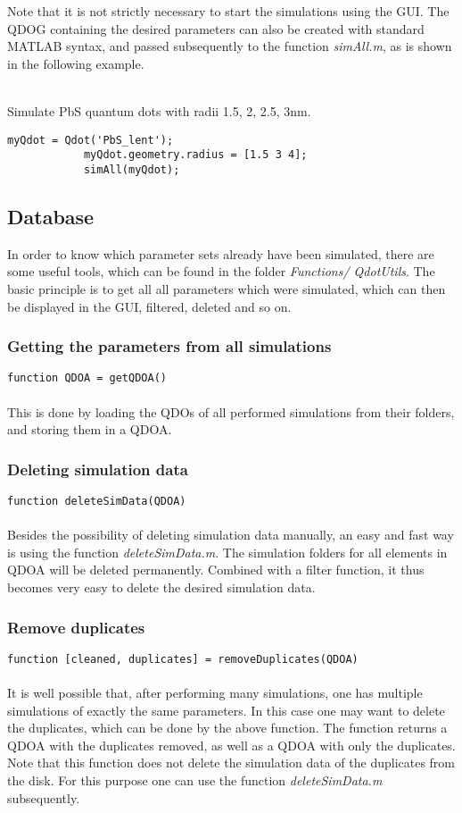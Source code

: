 	Note that it is not strictly necessary to start the simulations using the GUI. The QDOG containing the desired parameters can also be created with 
	standard MATLAB syntax, and passed subsequently to the function \textit{simAll.m}, as is shown in the following example.\\
	\\
	\begin{EXAMPLE} Simulate PbS  quantum dots with radii 1.5, 2, 2.5, 3nm. 
		\begin{lstlisting}[frame = none]
			myQdot = Qdot('PbS_lent');
			myQdot.geometry.radius = [1.5 3 4]; 
			simAll(myQdot);\end{lstlisting}
	\end{EXAMPLE}
	
	
\subsection{Database}
	In order to know which parameter sets already have been simulated, there are some useful tools, which can be found in the folder \textit{Functions/
	QdotUtils}. The basic principle is to get all all parameters which were simulated, which can then be displayed in the GUI, filtered, deleted and so on.
	
	\subsubsection{Getting the parameters from all simulations}
		\lstinline{function QDOA = getQDOA()}\\\\
		This is done by loading the QDOs of all performed simulations from their folders, and storing them in a QDOA. 
	\subsubsection{Deleting simulation data}
		\lstinline{function deleteSimData(QDOA)}\\\\
		Besides the possibility of deleting simulation data manually, an easy and fast way is using the function \textit{deleteSimData.m}. 
		The simulation folders for all elements in QDOA will be deleted permanently. Combined with a filter function, it thus becomes very easy to 
		delete the desired simulation data.
	\subsubsection{Remove duplicates}
		\lstinline{function [cleaned, duplicates] = removeDuplicates(QDOA)}\\\\
		It is well possible that, after performing many simulations, one has multiple simulations of exactly the same parameters. In this case one may 
		want to delete the duplicates, which can be done by the above function. The function returns a QDOA with the duplicates removed, as well as 
		a QDOA with only the duplicates. Note that this function does not delete the simulation data of the duplicates from the disk. For this purpose one 
		can use the function \textit{deleteSimData.m} subsequently.
